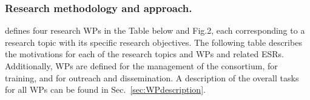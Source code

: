


\subsubsection{Research methodology and approach.}
\label{sec:metho}

\acronym defines four research WPs in the Table below and Fig.2, each corresponding to a research topic with its specific research objectives. 
The following table describes the motivations for each of the \acronym research topics and WPs and related ESRs. 
Additionally, WPs are defined for the management of the consortium, for training, and for outreach and dissemination.  
A description of the overall tasks for all WPs can be found in Sec.~\ref{sec:WPdescription}. 

